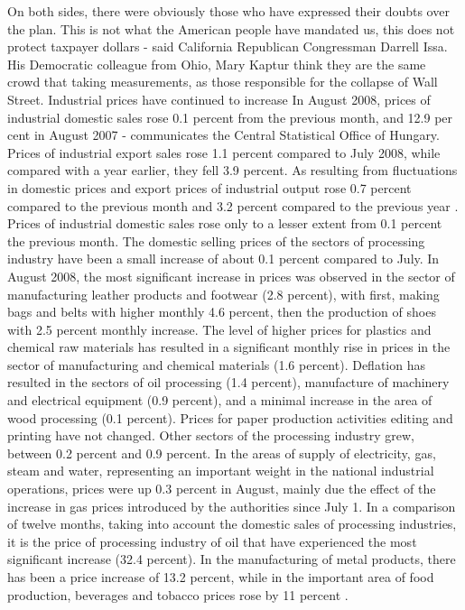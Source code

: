 On both sides, there were obviously those who have expressed their doubts over the plan.
This is not what the American people have mandated us, this does not protect taxpayer dollars - said California Republican Congressman Darrell Issa.
His Democratic colleague from Ohio, Mary Kaptur think they are the same crowd that taking measurements, as those responsible for the collapse of Wall Street.
Industrial prices have continued to increase
In August 2008, prices of industrial domestic sales rose 0.1 percent from the previous month, and 12.9 per cent in August 2007 - communicates the Central Statistical Office of Hungary.
Prices of industrial export sales rose 1.1 percent compared to July 2008, while compared with a year earlier, they fell 3.9 percent.
As resulting from fluctuations in domestic prices and export prices of industrial output rose 0.7 percent compared to the previous month and 3.2 percent compared to the previous year .
Prices of industrial domestic sales rose only to a lesser extent from 0.1 percent the previous month.
The domestic selling prices of the sectors of processing industry have been a small increase of about 0.1 percent compared to July.
In August 2008, the most significant increase in prices was observed in the sector of manufacturing leather products and footwear (2.8 percent), with first, making bags and belts with higher monthly 4.6 percent, then the production of shoes with 2.5 percent monthly increase.
The level of higher prices for plastics and chemical raw materials has resulted in a significant monthly rise in prices in the sector of manufacturing and chemical materials (1.6 percent).
Deflation has resulted in the sectors of oil processing (1.4 percent), manufacture of machinery and electrical equipment (0.9 percent), and a minimal increase in the area of wood processing (0.1 percent).
Prices for paper production activities editing and printing have not changed.
Other sectors of the processing industry grew, between 0.2 percent and 0.9 percent.
In the areas of supply of electricity, gas, steam and water, representing an important weight in the national industrial operations, prices were up 0.3 percent in August, mainly due the effect of the increase in gas prices introduced by the authorities since July 1.
In a comparison of twelve months, taking into account the domestic sales of processing industries, it is the price of processing industry of oil that have experienced the most significant increase (32.4 percent).
In the manufacturing of metal products, there has been a price increase of 13.2 percent, while in the important area of ​​food production, beverages and tobacco prices rose by 11 percent .
